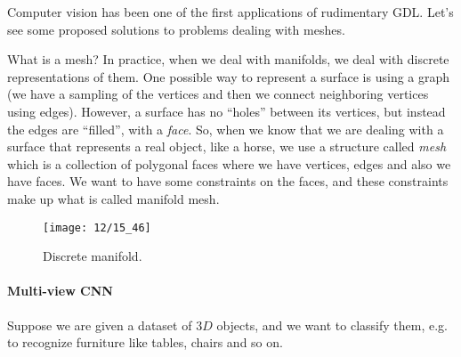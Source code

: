 
Computer vision has been one of the first applications of rudimentary GDL. Let's see some proposed solutions to problems dealing with meshes.

What is a mesh? In practice, when we deal with manifolds, we deal with discrete representations of them. One possible way to represent a surface is using a graph (we have a sampling of the vertices and then we connect neighboring vertices using edges). However, a surface has no ``holes'' between its vertices, but instead the edges are ``filled'', with a \emph{face}. So, when we know that we are dealing with a surface that represents a real object, like a horse, we use a structure called \emph{mesh} which is a collection of polygonal faces where we have vertices, edges and also we have faces. We want to have some constraints on the faces, and these constraints make up what is called manifold mesh.
\begin{figure}[H]
	\centering
	\texttt{[image: 12/15\_46]}
	\caption{Discrete manifold.}\label{fig:disc-manifold}	
\end{figure}

\paragraph{Multi-view CNN}
Suppose we are given a dataset of $3D$ objects, and we want to classify them, e.g. to recognize furniture like tables, chairs and so on.

